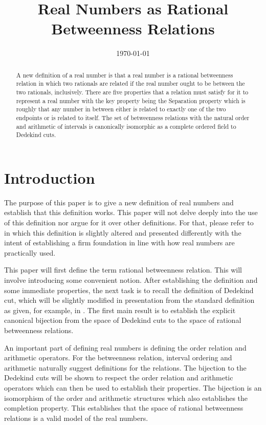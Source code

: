 \documentclass[12pt]{article}
\title{Real Numbers as Rational Betweenness Relations}
\date{\today}
\begin{document}
\maketitle
\begin{abstract}
A new definition of a real number is that a real number is a rational betweenness relation in which two rationals are related if the real number ought to be between the two rationals, inclusively. There are five properties that a relation must satisfy for it to represent a real number with the key property being the Separation property which is roughly that any number in between either is related to exactly one of the two endpoints or is related to itself. The set of betweenness relations with the natural order and arithmetic of intervals is canonically isomorphic as a complete ordered field to Dedekind cuts. 
\end{abstract}

\section{Introduction}

The purpose of this paper is to give a new definition of real numbers and establish that this definition works. This paper will not delve deeply into the use of this definition nor argue for it over other definitions. For that, please refer to \cite{taylor23main} in which this definition is slightly altered and presented differently with the intent of establishing a firm foundation in line with how real numbers are practically used.

This paper will first define the term rational betweenness relation. This will involve introducing some convenient notion. After establishing the definition and some immediate properties, the next task is to recall the definition of Dedekind cut, which will be slightly modified in presentation from the standard definition as given, for example, in \cite{rudin}. The first main result is to establish the explicit canonical bijection from the space of Dedekind cuts to the space of rational betweenness relations. 

An important part of defining real numbers is defining the order relation and arithmetic operators. For the betweenness relation, interval ordering and arithmetic naturally suggest definitions for the relations. The bijection to the Dedekind cuts will be shown to respect the order relation and arithmetic operators which can then be used to establish their properties. The bijection is an isomorphism of the order and arithmetic structures which also establishes the completion property.  This establishes that the space of rational betweenness relations is a valid model of the real numbers. 
\end{document}
